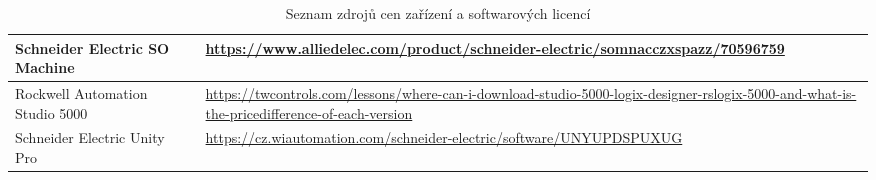 \begin{table}[H]
{\begin{tabular}{|C{4cm}|C{2.5cm}|C{10.5cm}|}
        Schneider Electric SO Machine &  & \url{https://www.alliedelec.com/product/schneider-electric/somnacczxspazz/70596759} \\\hline
        Rockwell Automation Studio 5000 &  &  \url{https://twcontrols.com/lessons/where-can-i-download-studio-5000-logix-designer-rslogix-5000-and-what-is-the-pricedifference-of-each-version}\\\hline
        Schneider Electric Unity Pro &  &  \url{https://cz.wiautomation.com/schneider-electric/software/UNYUPDSPUXUG} \\\hline
    \end{tabular}
    }
    \caption{Seznam zdrojů cen zařízení a softwarových licencí}
    \label{tab:device_prices}
\end{table}